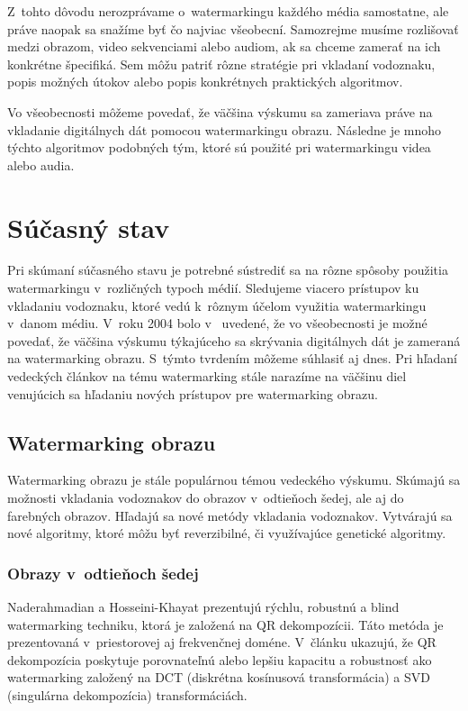 Z~tohto dôvodu nerozprávame o~watermarkingu každého média samostatne, ale práve naopak sa snažíme byť čo najviac všeobecní. Samozrejme musíme rozlišovať medzi obrazom, video sekvenciami alebo audiom, ak sa chceme zamerať na ich konkrétne špecifiká. Sem môžu patriť rôzne stratégie pri vkladaní vodoznaku, popis možných útokov alebo popis konkrétnych praktických algoritmov.

Vo všeobecnosti môžeme povedať, že väčšina výskumu sa zameriava práve na vkladanie digitálnych dát pomocou watermarkingu obrazu. Následne je mnoho týchto algoritmov podobných tým, ktoré sú použité pri watermarkingu videa alebo audia. \cite{Barni}


\chapter{Súčasný stav}
\label{ch-state}
Pri skúmaní súčasného stavu je potrebné sústrediť sa na rôzne spôsoby použitia watermarkingu v~rozličných typoch médií. Sledujeme viacero prístupov ku vkladaniu vodoznaku, ktoré vedú k~rôznym účelom využitia watermarkingu v~danom médiu. V~roku 2004 bolo v~\cite{Barni} uvedené, že vo všeobecnosti je možné povedať, že väčšina výskumu týkajúceho sa skrývania digitálnych dát je zameraná na watermarking obrazu. S~týmto tvrdením môžeme súhlasiť aj dnes. Pri hľadaní vedeckých článkov na tému watermarking stále narazíme na väčšinu diel venujúcich sa hľadaniu nových prístupov pre watermarking obrazu.

\section{Watermarking obrazu}
Watermarking obrazu je stále populárnou témou vedeckého výskumu. Skúmajú sa možnosti vkladania vodoznakov do obrazov v~odtieňoch šedej, ale aj do farebných obrazov. Hľadajú sa nové metódy vkladania vodoznakov. Vytvárajú sa nové algoritmy, ktoré môžu byť reverzibilné, či využívajúce genetické algoritmy.

\subsection{Obrazy v~odtieňoch šedej}
Naderahmadian a Hosseini-Khayat \cite{QRdecomposition} prezentujú rýchlu, robustnú a blind watermarking techniku, ktorá je založená na QR dekompozícii. Táto metóda je prezentovaná v~priestorovej aj frekvenčnej doméne. V~článku ukazujú, že QR dekompozícia poskytuje porovnateľnú alebo lepšiu kapacitu a robustnosť ako watermarking založený na DCT (diskrétna kosínusová transformácia) a SVD (singulárna dekompozícia) transformáciách.


